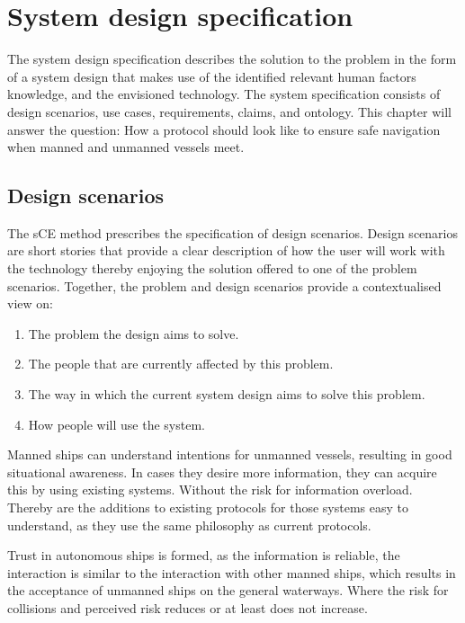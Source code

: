 \chapter{System design specification}
\label{ch:system-design}
The system design specification describes the solution to the problem in the form of a system design that makes use of the identified relevant human factors knowledge, and the envisioned technology. The system specification consists of design scenarios, use cases, requirements, claims, and ontology. This chapter will answer the question: How a protocol should look like to ensure safe navigation when manned and unmanned vessels meet.

\section{Design scenarios}
The sCE method prescribes the specification of design scenarios. Design scenarios are short stories that provide a clear description of how the user will work with the technology thereby enjoying the solution offered to one of the problem scenarios. Together, the problem and design scenarios provide a contextualised view on:
\begin{enumerate}
	\item The problem the design aims to solve.
	\item The people that are currently affected by this problem.
	\item The way in which the current system design aims to solve this problem.
	\item How people will use the system.
\end{enumerate}

Manned ships can understand intentions for unmanned vessels, resulting in good situational awareness. In cases they desire more information, they can acquire this by using existing systems. Without the risk for information overload. Thereby are the additions to existing protocols for those systems easy to understand, as they use the same philosophy as current protocols.

Trust in autonomous ships is formed, as the information is reliable, the interaction is similar to the interaction with other manned ships, which results in the acceptance of unmanned ships on the general waterways. Where the risk for collisions and perceived risk reduces or at least does not increase.

